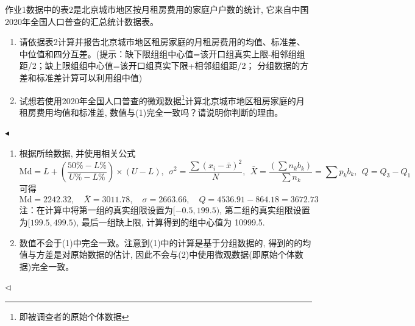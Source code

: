 \documentclass[11pt]{article}
\newenvironment{problem}[2][Problem]{\begin{trivlist}
\item[\hskip \labelsep {\bfseries #1}\hskip \labelsep {\bfseries #2.}]\songti}{\hfill$\blacktriangleleft$\end{trivlist}}
\newenvironment{answer}[1][Solution]{\begin{trivlist}
\item[\hskip \labelsep {\bfseries #1.}\hskip \labelsep]}{\hfill$\lhd$\end{trivlist}}
\newcommand\1{\mathds{1}}
\begin{document}
\begin{problem}{2}
    作业1数据中的表2是北京城市地区按月租房费用的家庭户户数的统计, 它来自中国2020年全国人口普查的汇总统计数据表。
    \begin{enumerate}[label=(\arabic*)]
        \item 请依据表2计算并报告北京城市地区租房家庭的月租房费用的均值、标准差、中位值和四分互差。{\kaishu(提示：缺下限组组中心值=该开口组真实上限-相邻组组距/2；缺上限组组中心值=该开口组真实下限+相邻组组距/2； 分组数据的方差和标准差计算可以利用组中值)}
        \item 试想若使用2020年全国人口普查的微观数据\footnote{即被调查者的原始个体数据}计算北京城市地区租房家庭的月租房费用均值和标准差, 数值与(1)完全一致吗？请说明你判断的理由。
    \end{enumerate}
\end{problem}
\begin{answer}
\begin{enumerate}[label=(\arabic*)]
    \item 根据所给数据, 并使用相关公式\[\text{Md} = L + \left( \frac{50\% - L\%}{U \% - L\%} \right) \times (U-L), ~~ \sigma^2 = \frac{\sum(x_{i} - \bar{x})^2}{N}, ~~ \bar{X} = \frac{\left( \sum n_{k} b_{k} \right)}{\sum n_{k}} = \sum p_{k} b_{k},~~ Q = Q_{3} - Q_{1}\]
    可得 \[\text{Md} = 2242.32,\quad \bar{X} = 3011.78, \quad \sigma = 2663.66, \quad Q = 4536.91 - 864.18 = 3672.73 \]
    注：在计算中将第一组的真实组限设置为$[-0.5,199.5)$, 第二组的真实组限设置为$[199.5,499.5)$, 最后一组缺上限, 计算得到的组中心值为 10999.5.
    \item 数值不会于(1)中完全一致。注意到(1)中的计算是基于分组数据的, 得到的的均值与方差是对原始数据的估计, 因此不会与(2)中使用微观数据(即原始个体数据)完全一致。
\end{enumerate}
\end{answer}
\end{document}
